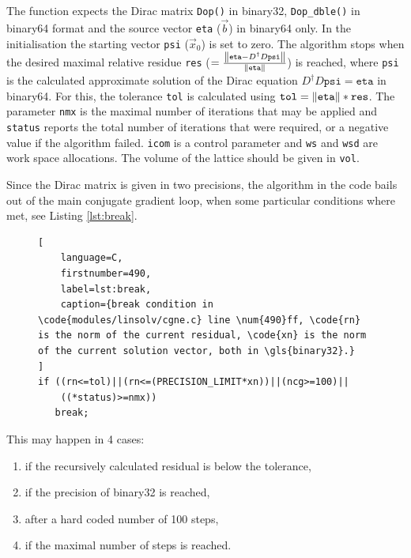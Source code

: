 \documentclass{article}
\theoremstyle{plain} %
\theoremstyle{convention} %
\theoremstyle{remark} %
\def\code#1{\texttt{#1}}
\numberwithin{equation}{section}
\begin{document}
The function expects the Dirac matrix \code{Dop()} in \gls{binary32}, \code{Dop\_dble()} in \gls{binary64} format and the source vector \code{eta} ($\vec{b}$) in \gls{binary64} only. In the initialisation the starting vector \code{psi} ($\vec{x}_0$) is set to zero. The algorithm stops when the desired maximal relative residue \code{res} ($=\frac{\norm{\code{eta}-D^\dagger D \code{psi}}}{\norm{\code{eta}}}$) is reached, where \code{psi} is the calculated approximate solution of the Dirac equation $D^\dagger D \code{psi}=\code{eta}$ in \gls{binary64}. For this, the tolerance \code{tol} is calculated using $\code{tol} = \norm{\code{eta}} * \code{res}$. The parameter \code{nmx} is the maximal number of iterations that may be applied and \code{status} reports the total number of iterations that were required, or a negative value if the algorithm failed. \code{icom} is a control parameter and \code{ws} and \code{wsd} are work space allocations. The volume of the lattice should be given in \code{vol}.

Since the Dirac matrix is given in two precisions, the algorithm in the code bails out of the main conjugate gradient loop, when some particular conditions where met, see Listing \ref{lst:break}.

\begin{figure} %
\begin{lstlisting}[
    language=C,
    firstnumber=490,
    label=lst:break,
    caption={break condition in \code{modules/linsolv/cgne.c} line \num{490}ff, \code{rn} is the norm of the current residual, \code{xn} is the norm of the current solution vector, both in \gls{binary32}.}
]
if ((rn<=tol)||(rn<=(PRECISION_LIMIT*xn))||(ncg>=100)||
    ((*status)>=nmx))
   break;
\end{lstlisting}
\end{figure} 

This may happen in 4 cases:

\begin{enumerate}
  \item if the recursively calculated residual is below the tolerance,
  \item if the precision of \gls{binary32} is reached\footnotemark,
  \item after a hard coded number of \num{100} steps,
  \item if the maximal number of steps is reached.
\end{enumerate}
\end{document}
